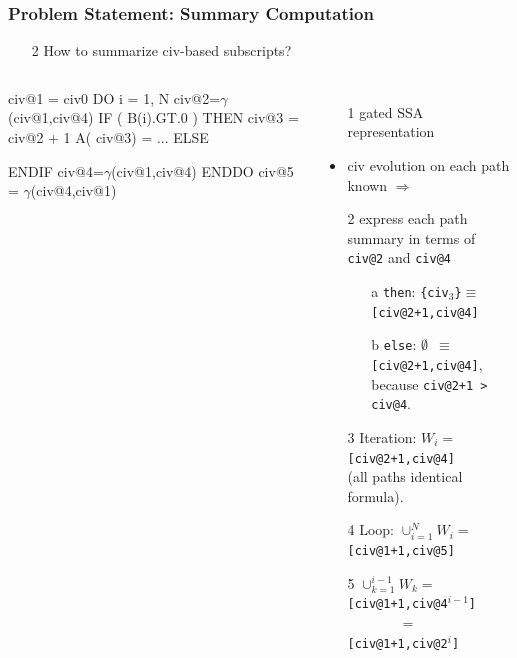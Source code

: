 \documentclass{beamer}
\newcommand{\emp}[1]{\textcolor{DikuRed}{ #1}}
\newcommand{\emphh}[1]{\textcolor{CosGreen}{ #1}}
\newcommand{\mymath}[1]{$ #1 $}
\newcommand{\myindx}[1]{_{#1}}
\newcommand{\myindu}[1]{^{#1}}
\begin{document}
\begin{frame}[fragile,t]
  \frametitle{Problem Statement: Summary Computation}

\begin{itemize}
    \item[\emp{2}] \emp{How to summarize {\sc civ}-based subscripts?}
\end{itemize}


\begin{columns}
\begin{colorcode}[fontsize=\small]
\emp{civ@1 = civ0}
DO i = 1, N
  \emp{civ@2=\mymath{\gamma}(civ@1,civ@4)}
  IF ( B(i).GT.0 ) THEN
    \emp{civ@3 = civ@2 + 1}
    A(\emphh{civ@3}) = ...
  ELSE

  ENDIF
  \emp{civ@4=\mymath{\gamma}(civ@1,civ@4)}
ENDDO
\emp{civ@5 = \mymath{\gamma}(civ@4,civ@1)}
\end{colorcode}
\begin{itemize}
    \item[1] gated SSA representation\pause
    \item {\sc civ} evolution on each path known $\Rightarrow$
    \item[2] express each path summary in terms of {\tt civ@2} and {\tt civ@4}
    \begin{itemize}
        \item[a] {\tt then}: {\tt \{civ$_3$\}$\equiv$\emphh{[civ@2+1,civ@4]}}\pause
        \item[b] {\tt else}: {\tt $\emptyset$ $\equiv$ \emphh{[civ@2+1,civ@4]}},
                    because {\tt civ@2+1 > civ@4}.
    \end{itemize}\pause
    \item[3] Iteration: $W_i = $\emphh{\tt{}[civ@2+1,civ@4]}\\
            (all paths identical formula).
    \item[4] Loop: $\cup_{i=1}^{N} W_i = $ \emphh{\tt{}[civ@1+1,civ@5]}\pause
    \item[5] $\cup_{k=1}^{i-1} W_k = $ \emphh{\tt{}[civ@1+1,civ@4$^{i-1}$]}\\
             $\mbox{~~~~~~~~~~~}=$ \emphh{\tt{}[civ@1+1,civ@2$^{i}$]}
\end{itemize}
\end{columns}
\bigskip
\bigskip

\end{frame}
\end{document}
